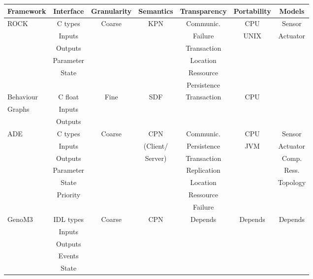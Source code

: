 \documentclass[a4paper,twocolumn]{esapub2005} %
\begin{document}
\begin{table*}
    \centering
    \begin{tabular}{l|cccccc}
        Framework & Interface & Granularity & Semantics & Transparency & Portability & Models \\
        \hline
        ROCK & C types & Coarse & KPN & Communic. & CPU & Sensor\\
             & Inputs  &        &     & Failure       & UNIX      & Actuator \\
             & Outputs &        &     & Transaction   &           & \\
             & Parameter &      &     & Location      &           & \\
             & State   &        &     & Ressource     &           & \\
             &         &        &     & Persistence   &           & \\
        \hline
        Behaviour & C float & Fine & SDF & Transaction & CPU & \\
        Graphs    & Inputs  &      &     &             &     & \\
                  & Outputs &      &     &             &     & \\
        \hline
        ADE  & C types & Coarse & CPN    & Communic. & CPU & Sensor\\
             & Inputs  &        & (Client/ & Persistence  & JVM & Actuator \\
             & Outputs &        & Server) & Transaction   &          & Comp.\\
             & Parameter &      &        & Replication   &          & Ress.\\
             & State     &      &        & Location      &          & Topology\\
             & Priority  &      &        & Ressource     &          & \\
             &         &        &     & Failure &           & \\
        \hline
        GenoM3 & IDL types & Coarse & CPN & Depends & Depends & Depends \\
               & Inputs    &      &     &           &       & \\
               & Outputs   &      &     &           &         & \\
               & Events    &      &     &             &     & \\
               & State     &      &        &               &          & \\

\end{tabular}
\end{table*}
\end{document}
